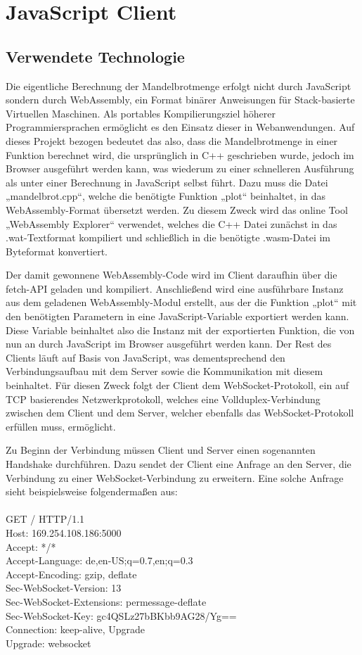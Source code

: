 \documentclass[12pt, onecolumn, notitlepage]{scrartcl}
\begin{document}
\section{JavaScript Client}
\subsection{Verwendete Technologie}
Die eigentliche Berechnung der Mandelbrotmenge erfolgt nicht durch JavaScript sondern durch WebAssembly, ein Format binärer Anweisungen für Stack-basierte Virtuellen Maschinen. Als portables Kompilierungsziel höherer Programmiersprachen ermöglicht es den Einsatz dieser in Webanwendungen.  Auf dieses Projekt bezogen bedeutet das also, dass die Mandelbrotmenge in einer Funktion berechnet wird, die ursprünglich in C++ geschrieben wurde, jedoch im Browser ausgeführt werden kann, was wiederum zu einer schnelleren Ausführung als unter einer Berechnung in JavaScript selbst führt. Dazu muss die Datei „mandelbrot.cpp“, welche die benötigte Funktion „plot“ beinhaltet, in das WebAssembly-Format übersetzt werden. Zu diesem Zweck wird das online Tool „WebAssembly Explorer“ verwendet, welches die C++ Datei zunächst in das .wat-Textformat kompiliert und schließlich in die benötigte .wasm-Datei im Byteformat konvertiert. \par
Der damit gewonnene WebAssembly-Code wird im Client daraufhin über die fetch-API geladen und kompiliert. Anschließend wird eine ausführbare Instanz aus dem geladenen WebAssembly-Modul erstellt, aus der die Funktion „plot“ mit den benötigten Parametern in eine JavaScript-Variable exportiert werden kann. Diese Variable beinhaltet also die Instanz mit der exportierten Funktion, die von nun an durch JavaScript im Browser ausgeführt werden kann.
Der Rest des Clients läuft auf Basis von JavaScript, was dementsprechend den Verbindungsaufbau mit dem Server sowie die Kommunikation mit diesem beinhaltet. Für diesen Zweck folgt der Client dem WebSocket-Protokoll, ein auf TCP basierendes Netzwerkprotokoll, welches eine Vollduplex-Verbindung zwischen dem Client und dem Server, welcher ebenfalls das WebSocket-Protokoll erfüllen muss, ermöglicht. \par
Zu Beginn der Verbindung müssen Client und Server einen sogenannten Handshake durchführen. Dazu sendet der Client eine Anfrage an den Server, die Verbindung zu einer WebSocket-Verbindung zu erweitern. Eine solche Anfrage sieht beispielsweise folgendermaßen aus: \\ \\
GET / HTTP/1.1 \\
Host: 169.254.108.186:5000 \\
Accept: */* \\
Accept-Language: de,en-US;q=0.7,en;q=0.3 \\
Accept-Encoding: gzip, deflate \\
Sec-WebSocket-Version: 13 \\
Sec-WebSocket-Extensions: permessage-deflate \\
Sec-WebSocket-Key: gc4QSLz27bBKbb9AG28/Yg== \\
Connection: keep-alive, Upgrade \\
Upgrade: websocket \\
\end{document}
